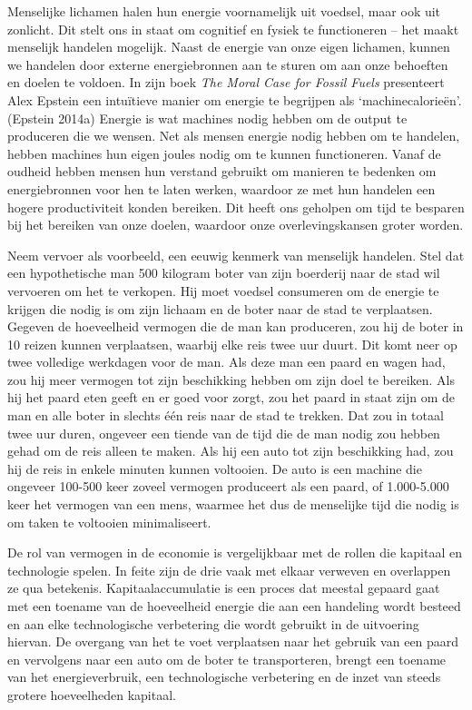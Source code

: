 \documentclass[
  a5paper,
  smalldemyvopaper,11pt,twoside,onecolumn,openright,extrafontsizes,
hidelinks]{memoir}
\begin{document}
Menselijke lichamen halen hun energie voornamelijk uit voedsel, maar ook
uit zonlicht. Dit stelt ons in staat om cognitief en fysiek te
functioneren -- het maakt menselijk handelen mogelijk. Naast de energie
van onze eigen lichamen, kunnen we handelen door externe energiebronnen
aan te sturen om aan onze behoeften en doelen te voldoen. In zijn boek
\emph{The Moral Case for Fossil Fuels} presenteert Alex Epstein een
intuïtieve manier om energie te begrijpen als `machinecalorieën'.
(Epstein 2014a) Energie is wat machines nodig hebben om de output te
produceren die we wensen. Net als mensen energie nodig hebben om te
handelen, hebben machines hun eigen joules nodig om te kunnen
functioneren. Vanaf de oudheid hebben mensen hun verstand gebruikt om
manieren te bedenken om energiebronnen voor hen te laten werken,
waardoor ze met hun handelen een hogere productiviteit konden bereiken.
Dit heeft ons geholpen om tijd te besparen bij het bereiken van onze
doelen, waardoor onze overlevingskansen groter worden.

Neem vervoer als voorbeeld, een eeuwig kenmerk van menselijk handelen.
Stel dat een hypothetische man 500 kilogram boter van zijn boerderij
naar de stad wil vervoeren om het te verkopen. Hij moet voedsel
consumeren om de energie te krijgen die nodig is om zijn lichaam en de
boter naar de stad te verplaatsen. Gegeven de hoeveelheid vermogen die
de man kan produceren, zou hij de boter in 10 reizen kunnen verplaatsen,
waarbij elke reis twee uur duurt. Dit komt neer op twee volledige
werkdagen voor de man. Als deze man een paard en wagen had, zou hij meer
vermogen tot zijn beschikking hebben om zijn doel te bereiken. Als hij
het paard eten geeft en er goed voor zorgt, zou het paard in staat zijn
om de man en alle boter in slechts één reis naar de stad te trekken. Dat
zou in totaal twee uur duren, ongeveer een tiende van de tijd die de man
nodig zou hebben gehad om de reis alleen te maken. Als hij een auto tot
zijn beschikking had, zou hij de reis in enkele minuten kunnen
voltooien. De auto is een machine die ongeveer 100-500 keer zoveel
vermogen produceert als een paard, of 1.000-5.000 keer het vermogen van
een mens, waarmee het dus de menselijke tijd die nodig is om taken te
voltooien minimaliseert.

De rol van vermogen in de economie is vergelijkbaar met de rollen die
kapitaal en technologie spelen. In feite zijn de drie vaak met elkaar
verweven en overlappen ze qua betekenis. Kapitaalaccumulatie is een
proces dat meestal gepaard gaat met een toename van de hoeveelheid
energie die aan een handeling wordt besteed en aan elke technologische
verbetering die wordt gebruikt in de uitvoering hiervan. De overgang van
het te voet verplaatsen naar het gebruik van een paard en vervolgens
naar een auto om de boter te transporteren, brengt een toename van het
energieverbruik, een technologische verbetering en de inzet van steeds
grotere hoeveelheden kapitaal.
\end{document}
